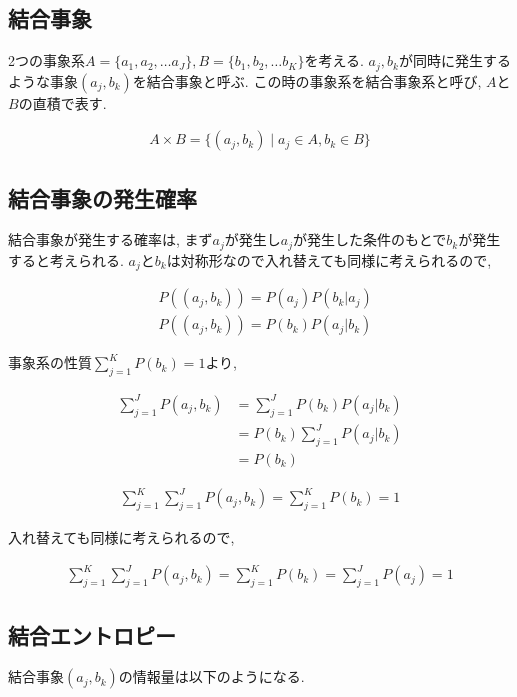\documentclass[dvipdfmx, 10pt]{jsarticle}
\begin{document}
\subsection*{結合事象}
2つの事象系\(A = \{a_1, a_2, \dots a_J\}, B = \{b_1, b_2, \dots b_K\}\)を考える. 
\(a_j, b_k\)が同時に発生するような事象\((a_j, b_k)\)を結合事象と呼ぶ. 
この時の事象系を結合事象系と呼び, \(A\)と\(B\)の直積で表す. 

\begin{align*}
    A \times B = \{(a_j, b_k) \mid a_j \in A, b_k \in B\}
\end{align*}

\subsection*{結合事象の発生確率}
結合事象が発生する確率は, まず\(a_j\)が発生し\(a_j\)が発生した条件のもとで\(b_k\)が発生すると考えられる. 
\(a_j\)と\(b_k\)は対称形なので入れ替えても同様に考えられるので, 

\begin{align*}
    & P((a_j, b_k)) = P(a_j) P(b_k | a_j) \\
    & P((a_j, b_k)) = P(b_k) P(a_j | b_k)
\end{align*}

事象系の性質\(\sum_{j=1}^{K} P(b_k) = 1\)より, 

\begin{align*}
    \sum_{j=1}^{J} P(a_j, b_k) 
    &= \sum_{j=1}^{J} P(b_k) P(a_j | b_k) \\
    &= P(b_k) \sum_{j=1}^{J} P(a_j | b_k) \\
    &= P(b_k) 
\end{align*}

\begin{align*}
    \sum_{j=1}^{K} \sum_{j=1}^{J} P(a_j, b_k) = \sum_{j=1}^{K} P(b_k) = 1
\end{align*}

入れ替えても同様に考えられるので, 

\begin{align*}
    \sum_{j=1}^{K} \sum_{j=1}^{J} P(a_j, b_k) = \sum_{j=1}^{K} P(b_k) = \sum_{j=1}^{J} P(a_j) = 1
\end{align*}

\subsection*{結合エントロピー}
結合事象\((a_j, b_k)\)の情報量は以下のようになる. 
\end{document}
